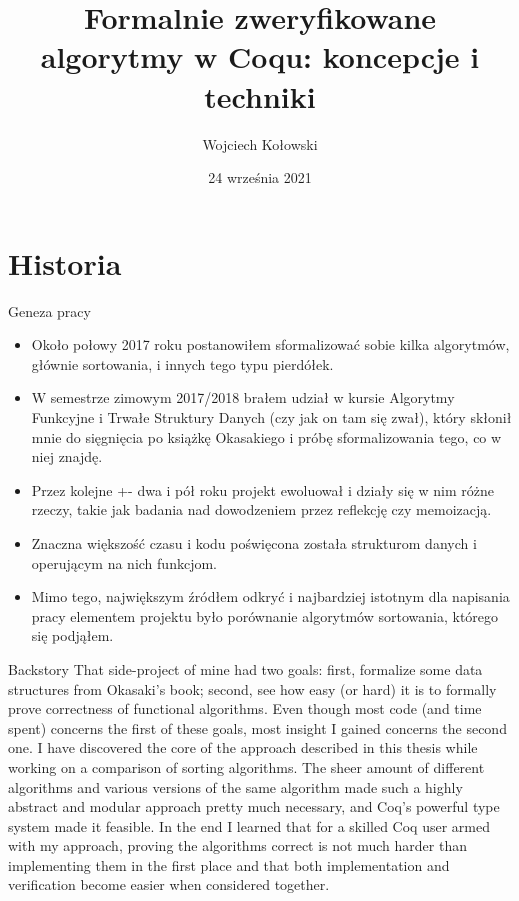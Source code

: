 \documentclass{beamer}
\title{Formalnie zweryfikowane algorytmy w Coqu: koncepcje i techniki}
\author{Wojciech Kołowski}
\date{24 września 2021}
\begin{document}
\frame{\titlepage}

\frame{\tableofcontents}

\section{Historia}

\begin{frame}{Geneza pracy}
\begin{itemize}
	\item Około połowy 2017 roku postanowiłem sformalizować sobie kilka algorytmów, głównie sortowania, i innych tego typu pierdółek.
	\item W semestrze zimowym 2017/2018 brałem udział w kursie Algorytmy Funkcyjne i Trwałe Struktury Danych (czy jak on tam się zwał), który skłonił mnie do sięgnięcia po książkę Okasakiego i próbę sformalizowania tego, co w niej znajdę.
	\item Przez kolejne +- dwa i pół roku projekt ewoluował i działy się w nim różne rzeczy, takie jak badania nad dowodzeniem przez reflekcję czy memoizacją.
	\item Znaczna większość czasu i kodu poświęcona została strukturom danych i operującym na nich funkcjom.
	\item Mimo tego, największym źródłem odkryć i najbardziej istotnym dla napisania pracy elementem projektu było porównanie algorytmów sortowania, którego się podjąłem.
\end{itemize}
\end{frame}

\begin{frame}{Backstory}
	That side-project of mine had two goals: first, formalize some data structures from Okasaki's book; second, see how easy (or hard) it is to formally prove correctness of functional algorithms. Even though most code (and time spent) concerns the first of these goals, most insight I gained concerns the second one. I have discovered the core of the approach described in this thesis while working on a comparison of sorting algorithms. The sheer amount of different algorithms and various versions of the same algorithm made such a highly abstract and modular approach pretty much necessary, and Coq's powerful type system made it feasible. In the end I learned that for a skilled Coq user armed with my approach, proving the algorithms correct is not much harder than implementing them in the first place and that both implementation and verification become easier when considered together.
\end{frame}
\end{document}
